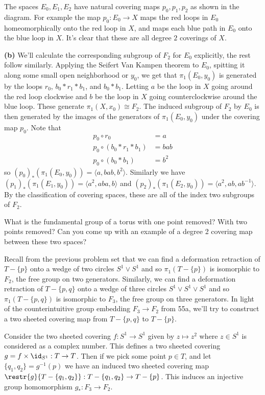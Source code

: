 \documentclass[11pt,letterpaper]{article}
\begin{document}
\begin{solution}
    The spaces $E_0, E_1, E_2$ have natural covering maps $p_0, p_1, p_2$ as shown in the diagram. For example the map $p_0 : E_0 \to X$ maps the red loops in $E_0$ homeomorphically onto the red loop in $X$, and maps each blue path in $E_0$ onto the blue loop in $X$. It's clear that these are all degree $2$ coverings of $X$.

    \textbf{(b)} We'll calculate the corresponding subgroup of $F_2$ for $E_0$ explicitly, the rest follow similarly. Applying the Seifert Van Kampen theorem to $E_0$, spitting it along some small open neighborhood or $y_0$, we get that $\pi_1(E_0, y_0)$ is generated by the loops $r_0$, $b_0*r_1*b_1$, and $b_0*b_1$. Letting $a$ be the loop in $X$ going around the red loop clockwise and $b$ be the loop in $X$ going counterclockwise around the blue loop. These generate $\pi_1(X,x_0)\cong F_2$. The induced subgroup of $F_2$ by $E_0$ is then generated by the images of the generators of $\pi_1(E_0,y_0)$ under the covering map $p_0$. Note that
    \[
        \begin{aligned}
            p_0\circ r_0 &= a\\
            p_0\circ (b_0*r_1*b_1) &= bab\\
            p_0\circ (b_0*b_1) &= b^2
        \end{aligned}
    \]
    so $(p_0)_*(\pi_1(E_0,y_0))=\big\langle a,bab, b^2 \big\rangle$. Similarly we have $(p_1)_*(\pi_1(E_1,y_0))=\big\langle a^2, aba, b \big\rangle$ and $(p_2)_*(\pi_1(E_2, y_0))=\big\langle a^2,ab, ab^{-1} \big\rangle$. By the classification of covering spaces, these are all of the index two subgroups of $F_2$. 
\end{solution}

\begin{problem}
    What is the fundamental group of a torus with one point removed?  With two points removed? Can you come up with an example of a degree 2 covering map between these two spaces?
\end{problem}

\begin{solution}
    Recall from the previous problem set that we can find a deformation retraction of $T-\{p\}$ onto a wedge of two circles $S^1\vee S^1$ and so $\pi_1(T-\{p\})$ is isomorphic to $F_2$, the free group on two generators. Similarly, we can find a deformation retraction of $T-\{p,q\}$ onto a wedge of three circles $S^1\vee S^1\vee S^1$ and so $\pi_1(T-\{p,q\})$ is isomorphic to $F_3$, the free group on three generators. In light of the counterintuitive group embedding $F_3\to F_2$ from 55a, we'll try to construct a two sheeted covering map from $T-\{p,q\}$ to $T-\{p\}$. 
    
    Consider the two sheeted covering $f : S^1 \to S^1$ given by $z\mapsto z^2$ where $z\in S^1$ is considered as a complex number. This defines a two sheeted covering $g=f\times \id_{S^1} : T \to T$. Then if we pick some point $p\in T$, and let $\{q_1,q_2\}=g^{-1}(p)$ we have an induced two sheeted covering map $\restr{g}{T-\{q_1,q_2\}} : T-\{q_1,q_2\} \to T-\{p\}$. This induces an injective group homomorphism $g_* : F_3 \to F_2$.
\end{solution}
\end{document}
